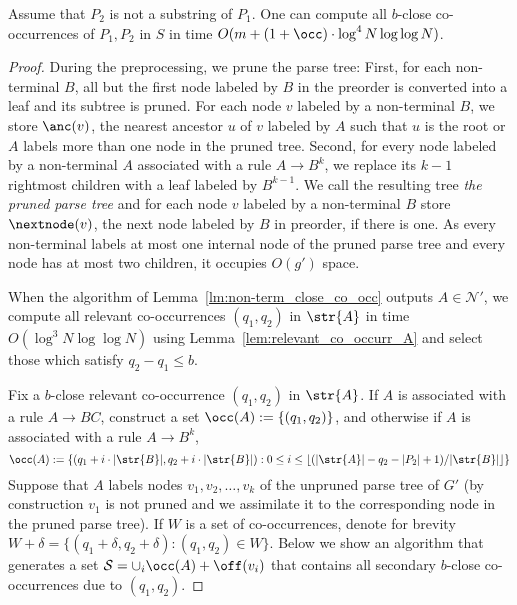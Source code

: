 \begin{lemma}
\label{lem:close_co_occurr}
Assume that $P_2$ is not a substring of $P_1$. One can compute all $b$-close co-occurrences of $P_1, P_2$  in $S$ in time $O(m + (1+\occ) \cdot \log^{4} N \log\log N)$. 
\end{lemma}
\begin{proof}
    During the preprocessing, we prune the parse tree: First, for each non-terminal $B$, all but the first node labeled by $B$ in the preorder is converted into a leaf and its subtree is pruned. For each node $v$ labeled by a non-terminal $B$, we store $\anc(v)$, the nearest ancestor $u$ of $v$ labeled by $A$ such that $u$ is the root or $A$ labels more than one node in the pruned tree. Second, for every node labeled by a non-terminal $A$ associated with a rule $A \rightarrow B^k$, we replace its $k-1$ rightmost children with a leaf labeled by $B^{k-1}$. We call the resulting tree \emph{the pruned parse tree} and for each node $v$ labeled by a non-terminal $B$ store $\nextnode(v)$, the next node labeled by $B$ in preorder, if there is one. As every non-terminal labels at most one internal node of the pruned parse tree and every node has at most two children, it occupies $O(g')$ space.
    
    When the algorithm of Lemma~\ref{lm:non-term_close_co_occ} outputs $A \in \mathcal{N}'$, we compute all relevant co-occurrences $(q_1,q_2)$ in $\str{A}$ in time $O(\log^{3} N\log \log N)$ using Lemma~\ref{lem:relevant_co_occurr_A} and select those which satisfy $q_2-q_1 \leq b$.
    
    Fix a $b$-close relevant co-occurrence $(q_1,q_2)$ in $\str{A}$. If $A$ is associated with a rule $A \rightarrow BC$, construct a set $\occ(A) := \{(q_1,q_2)\}$, and otherwise if $A$ is associated with a rule $A \rightarrow B^k$,
    $$\occ(A) := \{(q_1+i \cdot |\str{B}|, q_2+i \cdot |\str{B}|) : 0 \le i \le \lfloor (|\str{A}|-q_2-|P_2|+1)/|\str{B}| \rfloor\}$$
    Suppose that $A$ labels nodes $v_1, v_2, \ldots, v_k$ of the unpruned parse tree of $G'$ (by construction $v_1$ is not pruned and we assimilate it to the corresponding node in the pruned parse tree). If $W$ is a set of co-occurrences, denote for brevity $W+\delta = \{(q_1+\delta,q_2+\delta) : (q_1,q_2) \in W\}$. Below we show an algorithm that generates a set $\mathcal{S} = \cup_i \occ(A) + \off(v_i)$ that contains all secondary $b$-close co-occurrences due to $(q_1,q_2)$.  
    

\end{proof}
